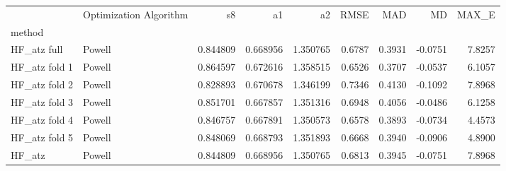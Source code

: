 \begin{tabular}{llrrrrrrr}
 & Optimization Algorithm & s8 & a1 & a2 & RMSE & MAD & MD & MAX_E \\
method &  &  &  &  &  &  &  &  \\
HF_atz full & Powell & 0.844809 & 0.668956 & 1.350765 & 0.6787 & 0.3931 & -0.0751 & 7.8257 \\
HF_atz fold 1 & Powell & 0.864597 & 0.672616 & 1.358515 & 0.6526 & 0.3707 & -0.0537 & 6.1057 \\
HF_atz fold 2 & Powell & 0.828893 & 0.670678 & 1.346199 & 0.7346 & 0.4130 & -0.1092 & 7.8968 \\
HF_atz fold 3 & Powell & 0.851701 & 0.667857 & 1.351316 & 0.6948 & 0.4056 & -0.0486 & 6.1258 \\
HF_atz fold 4 & Powell & 0.846757 & 0.667891 & 1.350573 & 0.6578 & 0.3893 & -0.0734 & 4.4573 \\
HF_atz fold 5 & Powell & 0.848069 & 0.668793 & 1.351893 & 0.6668 & 0.3940 & -0.0906 & 4.8900 \\
HF_atz & Powell & 0.844809 & 0.668956 & 1.350765 & 0.6813 & 0.3945 & -0.0751 & 7.8968 \\
\end{tabular}
